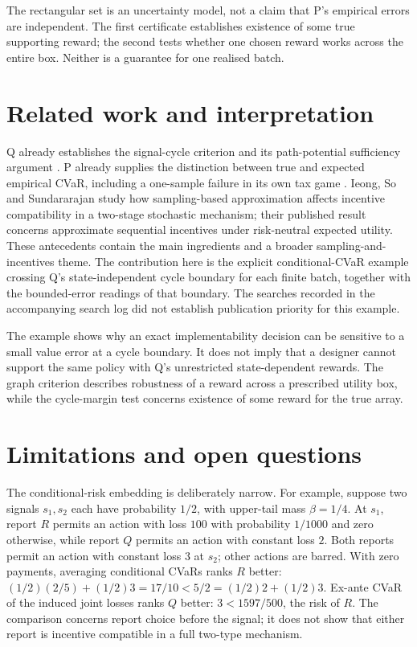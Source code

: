 \documentclass{article}
\begin{document}
The rectangular set is an uncertainty model, not a claim that P's empirical errors are independent. The first certificate establishes existence of some true supporting reward; the second tests whether one chosen reward works across the entire box. Neither is a guarantee for one realised batch. %

\section{Related work and interpretation}

Q already establishes the signal-cycle criterion and its path-potential sufficiency argument \cite{bergemann2026alignment}. P already supplies the distinction between true and expected empirical CVaR, including a one-sample failure in its own tax game \cite{pathfinder2026fixedbatch}. Ieong, So and Sundararajan \cite{ieong2007stochastic} study how sampling-based approximation affects incentive compatibility in a two-stage stochastic mechanism; their published result concerns approximate sequential incentives under risk-neutral expected utility. These antecedents contain the main ingredients and a broader sampling-and-incentives theme. The contribution here is the explicit conditional-CVaR example crossing Q's state-independent cycle boundary for each finite batch, together with the bounded-error readings of that boundary. The searches recorded in the accompanying search log did not establish publication priority for this example. %

The example shows why an exact implementability decision can be sensitive to a small value error at a cycle boundary. It does not imply that a designer cannot support the same policy with Q's unrestricted state-dependent rewards. The graph criterion describes robustness of a reward across a prescribed utility box, while the cycle-margin test concerns existence of some reward for the true array. %

\section{Limitations and open questions}

The conditional-risk embedding is deliberately narrow. For example, suppose two signals \(s_1,s_2\) each have probability \(1/2\), with upper-tail mass \(\beta=1/4\). At \(s_1\), report \(R\) permits an action with loss \(100\) with probability \(1/1000\) and zero otherwise, while report \(Q\) permits an action with constant loss \(2\). Both reports permit an action with constant loss \(3\) at \(s_2\); other actions are barred. With zero payments, averaging conditional CVaRs ranks \(R\) better: \((1/2)(2/5)+(1/2)3=17/10<5/2=(1/2)2+(1/2)3\). Ex-ante CVaR of the induced joint losses ranks \(Q\) better: \(3<1597/500\), the risk of \(R\). The comparison concerns report choice before the signal; it does not show that either report is incentive compatible in a full two-type mechanism. %
\end{document}
